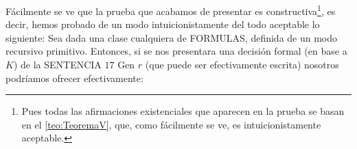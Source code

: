 Fácilmente se ve que la prueba que acabamos de presentar es constructiva\footnote{Pues todas las afirmaciones existenciales que aparecen en la prueba se
basan en el \autoref{teo:TeoremaV}, que, como fácilmente se ve, es intuicionistamente aceptable.}, es decir, hemos probado de un modo intuicionistamente 
del todo aceptable lo siguiente: Sea dada una clase cualquiera de FORMULAS, definida de un modo recursivo primitivo. Entonces, si se nos presentara una 
decisión formal (en base a $K$) de la SENTENCIA $17 \text{ Gen } r$ (que puede ser efectivamente escrita) nosotros podríamos ofrecer efectivamente:


\endinput

